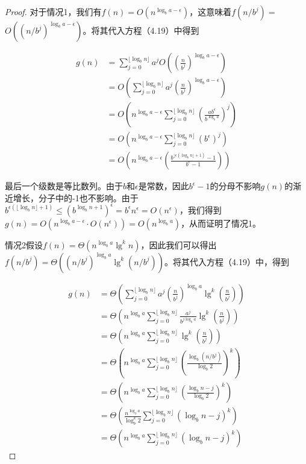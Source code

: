 \documentclass[lang=cn,newtx,10pt,scheme=chinese]{elegantbook}
\begin{document}
\begin{proof}
对于情况1，我们有$f(n)=O(n^{\log _b a-\epsilon})$，这意味着$f(n / b^j)=$ $O((n/b^j)^{\log _b a-\epsilon})$。将其代入方程（4.19）中得到

$$
\begin{aligned}
g(n) & =\sum_{j=0}^{\lfloor\log _b n\rfloor} a^j O((\frac{n}{b^j})^{\log _b a-\epsilon}) \\
& =O(\sum_{j=0}^{\lfloor\log _b n\rfloor} a^j(\frac{n}{b^j})^{\log _b a-\epsilon}) \\
& =O(n^{\log _b a-\epsilon} \sum_{j=0}^{\lfloor\log _b n\rfloor}(\frac{a b^\epsilon}{b^{\log _b a}})^j) \\
& =O(n^{\log _b a-\epsilon} \sum_{j=0}^{\lfloor\log _b n\rfloor}(b^\epsilon)^j) \\
& =O(n^{\log _b a-\epsilon}(\frac{b^{\lfloor\epsilon(\log _b n\rfloor+1)}-1}{b^\epsilon-1}))
\end{aligned}
$$

最后一个级数是等比数列。由于$b$和$\epsilon$是常数，因此$b^\epsilon-1$的分母不影响$g(n)$的渐近增长，分子中的-1也不影响。由于$b^{\epsilon(\lfloor\log _b n\rfloor+1)} \leq(b^{\log _b n+1})^\epsilon=b^\epsilon n^\epsilon=O(n^\epsilon)$，我们得到$g(n)=O(n^{\log _b a-\epsilon} \cdot O(n^\epsilon))=O(n^{\log _b a})$，从而证明了情况1。

情况2假设$f(n)=\Theta(n^{\log _b a} \lg ^k n)$，因此我们可以得出$f(n / b^j)=\Theta((n / b^j)^{\log _b a} \lg ^k(n / b^j))$。将其代入方程（4.19）中，得到

$$
\begin{aligned}
g(n) & =\Theta(\sum_{j=0}^{\lfloor\log _b n\rfloor} a^j(\frac{n}{b^j})^{\log _b a} \lg ^k(\frac{n}{b^j})) \\
& =\Theta(n^{\log _b a} \sum_{j=0}^{\lfloor\log _b n\rfloor} \frac{a^j}{b^{j \log _b a}} \lg ^k(\frac{n}{b^j})) \\
& =\Theta(n^{\log _b a} \sum_{j=0}^{\lfloor\log _b n\rfloor} \lg ^k(\frac{n}{b^j})) \\
& =\Theta(n^{\log _b a} \sum_{j=0}^{\lfloor\log _b n\rfloor}(\frac{\log _b(n / b^j)}{\log _b 2})^k) \\
& =\Theta(n^{\log _b a} \sum_{j=0}^{\lfloor\log _b n\rfloor}(\frac{\log _b n-j}{\log _b 2})^k) \\
& =\Theta(\frac{n^{\log _b a}}{\log _b^k 2} \sum_{j=0}^{\lfloor\log _b n\rfloor}(\log _b n-j)^k) \\
& =\Theta(n^{\log _b a} \sum_{j=0}^{\lfloor\log _b n\rfloor}(\log _b n-j)^k)
\end{aligned}
$$


\end{proof}
\end{document}
